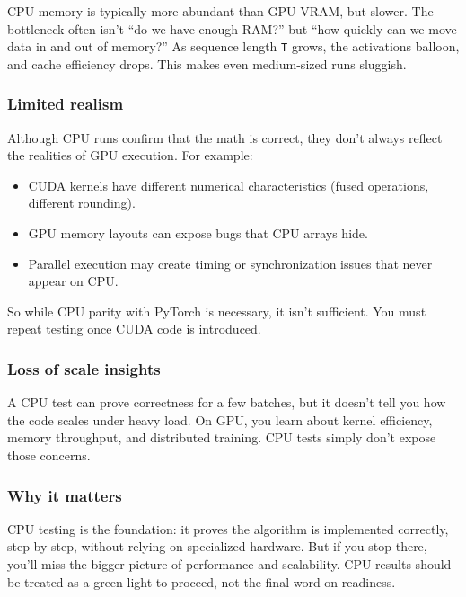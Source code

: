 \documentclass[
  letterpaper,
  DIV=11,
  numbers=noendperiod]{scrreprt}
\providecommand{\tightlist}{%
  \setlength{\itemsep}{0pt}\setlength{\parskip}{0pt}}
\begin{document}
CPU memory is typically more abundant than GPU VRAM, but slower. The
bottleneck often isn't ``do we have enough RAM?'' but ``how quickly can
we move data in and out of memory?'' As sequence length \texttt{T}
grows, the activations balloon, and cache efficiency drops. This makes
even medium-sized runs sluggish.

\subsubsection{Limited realism}\label{limited-realism}

Although CPU runs confirm that the math is correct, they don't always
reflect the realities of GPU execution. For example:

\begin{itemize}
\tightlist
\item
  CUDA kernels have different numerical characteristics (fused
  operations, different rounding).
\item
  GPU memory layouts can expose bugs that CPU arrays hide.
\item
  Parallel execution may create timing or synchronization issues that
  never appear on CPU.
\end{itemize}

So while CPU parity with PyTorch is necessary, it isn't sufficient. You
must repeat testing once CUDA code is introduced.

\subsubsection{Loss of scale insights}\label{loss-of-scale-insights}

A CPU test can prove correctness for a few batches, but it doesn't tell
you how the code scales under heavy load. On GPU, you learn about kernel
efficiency, memory throughput, and distributed training. CPU tests
simply don't expose those concerns.

\subsubsection{Why it matters}\label{why-it-matters-36}

CPU testing is the foundation: it proves the algorithm is implemented
correctly, step by step, without relying on specialized hardware. But if
you stop there, you'll miss the bigger picture of performance and
scalability. CPU results should be treated as a green light to proceed,
not the final word on readiness.
\end{document}
